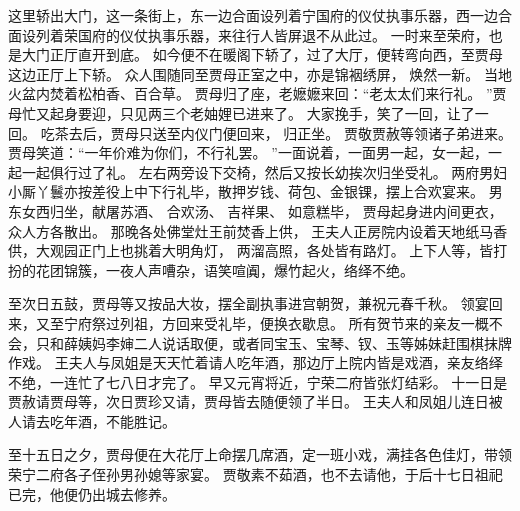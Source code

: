 这里轿出大门，这一条街上，东一边合面设列着宁国府的仪仗执事乐器，西一边合面设列着荣国府的仪仗执事乐器，来往行人皆屏退不从此过。
一时来至荣府，也是大门正厅直开到底。
如今便不在暖阁下轿了，过了大厅，便转弯向西，至贾母这边正厅上下轿。
众人围随同至贾母正室之中，亦是锦裀绣屏，
焕然一新。
当地火盆内焚着松柏香、百合草。
贾母归了座，老嬷嬷来回：“老太太们来行礼。
”贾母忙又起身要迎，只见两三个老妯娌已进来了。
大家挽手，笑了一回，让了一回。
吃茶去后，贾母只送至内仪门便回来，
归正坐。
贾敬贾赦等领诸子弟进来。
贾母笑道：“一年价难为你们，不行礼罢。
”一面说着，一面男一起，女一起，一起一起俱行过了礼。
左右两旁设下交椅，然后又按长幼挨次归坐受礼。
两府男妇小厮丫鬟亦按差役上中下行礼毕，散押岁钱、荷包、金银锞，摆上合欢宴来。
男东女西归坐，献屠苏酒、
合欢汤、
吉祥果、
如意糕毕，
贾母起身进内间更衣，众人方各散出。
那晚各处佛堂灶王前焚香上供，
王夫人正房院内设着天地纸马香供，大观园正门上也挑着大明角灯，
两溜高照，各处皆有路灯。
上下人等，皆打扮的花团锦簇，一夜人声嘈杂，语笑喧阗，爆竹起火，络绎不绝。
\par
至次日五鼓，贾母等又按品大妆，摆全副执事进宫朝贺，兼祝元春千秋。
领宴回来，又至宁府祭过列祖，方回来受礼毕，便换衣歇息。
所有贺节来的亲友一概不会，只和薛姨妈李婶二人说话取便，或者同宝玉、宝琴、钗、玉等姊妹赶围棋抹牌作戏。
王夫人与凤姐是天天忙着请人吃年酒，那边厅上院内皆是戏酒，亲友络绎不绝，一连忙了七八日才完了。
早又元宵将近，宁荣二府皆张灯结彩。
十一日是贾赦请贾母等，次日贾珍又请，贾母皆去随便领了半日。
王夫人和凤姐儿连日被人请去吃年酒，不能胜记。
\par
至十五日之夕，贾母便在大花厅上命摆几席酒，定一班小戏，满挂各色佳灯，带领荣宁二府各子侄孙男孙媳等家宴。
贾敬素不茹酒，也不去请他，于后十七日祖祀已完，他便仍出城去修养。
